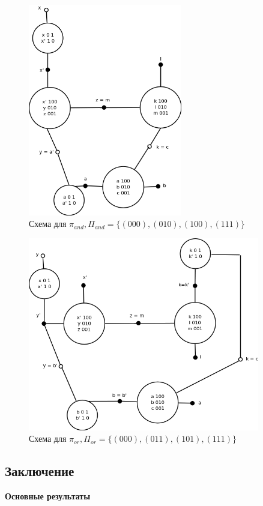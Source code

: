 \documentclass[12pt]{article}
\begin{document}
\begin{figure}[htb]
\centering
\includegraphics[width=0.6\textwidth]{min_and.png}
\caption{Схема для $\pi_{and}, \Pi_{and} = \{ (000), (010), (100), (111) \}$}
\label{fig:and}
\end{figure}

\begin{figure}[htb]
\centering
\includegraphics[width=0.9\textwidth]{min_or.png}
\caption{Схема для $\pi_{or}, \Pi_{or} = \{ (000), (011), (101), (111) \}$}
\label{fig:or}
\end{figure}

\clearpage
\subsection{Заключение}
\textbf{Основные результаты}
\end{document}
